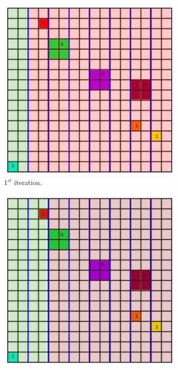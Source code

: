 \documentclass[11pt,a4paper]{article}
\begin{document}
\begin{figure}[H]	
     \centering
     \begin{subfigure}[b]{0.475\textwidth}
         \centering
         \includegraphics[width=\textwidth]{images/kdtree/grid_2.png}
         \caption{$1^{st} $ iteration.}
         \label{fig:pi_4000}
     \end{subfigure}
     \hfill
     \begin{subfigure}[b]{0.475\textwidth}
         \centering
         \includegraphics[width=\textwidth]{images/kdtree/grid_3.png}

\end{subfigure}
\end{figure}
\end{document}
